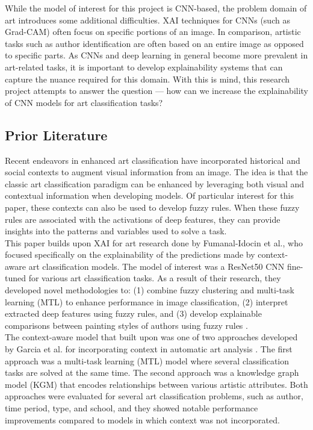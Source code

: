 \documentclass{article}
\begin{document}
While the model of interest for this project is CNN-based, the problem domain of art introduces some additional difficulties.  XAI techniques for CNNs (such as Grad-CAM) often focus on specific portions of an image. In comparison, artistic tasks such as author identification are often based on an entire image as opposed to specific parts. As CNNs and deep learning in general become more prevalent in art-related tasks, it is important to develop explainability systems that can capture the nuance required for this domain. With this is mind, this research project attempts to answer the question --- how can we increase the explainability of CNN models for art classification tasks? \\

\subsection{Prior Literature}
Recent endeavors in enhanced art classification have incorporated historical and social contexts to augment visual information from an image. The idea is that the classic art classification paradigm can be enhanced by leveraging both visual and contextual information when developing models. Of particular interest for this paper, these contexts can also be used to develop fuzzy rules. When these fuzzy rules are  associated with the activations of deep features, they can provide insights into the patterns and variables used to solve a task. \\
 
This paper builds upon XAI for art research done by Fumanal-Idocin et al., who focused specifically on the explainability of the predictions made by context-aware art classification models. The model of interest was a ResNet50 CNN fine-tuned for various art classification tasks. As a result of their research, they developed novel methodologies to: (1) combine fuzzy clustering and multi-task learning (MTL) to enhance performance in image classification, (2) interpret extracted deep features using fuzzy rules, and (3) develop explainable comparisons between painting styles of authors using fuzzy rules \cite{Fuminides}.\\
 
The context-aware model that \cite{Fuminides} built upon was one of two approaches developed by Garcia et al. for incorporating context in automatic art analysis \cite{Garcia2017Context}. The first approach was a multi-task learning (MTL) model where several classification tasks are solved at the same time. The second approach was a knowledge graph model (KGM) that encodes relationships between various artistic attributes. Both approaches were evaluated for several art classification problems, such as author, time period, type, and school, and they showed notable performance improvements compared to models in which context was not incorporated. \\ 
\end{document}
